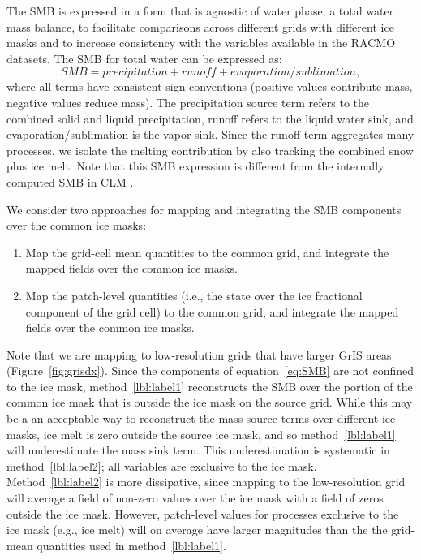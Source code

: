 \documentclass[draft]{agujournal2019}
\begin{document}
The SMB is expressed in a form that is agnostic of water phase, a total water mass balance, to facilitate comparisons across different grids with different ice masks and to increase consistency with the variables available in the RACMO datasets. The SMB for total water can be expressed as:
\begin{equation}
SMB = precipitation + runoff + evaporation/sublimation, \label{eq:SMB}
\end{equation}
where all terms have consistent sign conventions (positive values contribute mass, negative values reduce mass). The precipitation source term refers to the combined solid and liquid precipitation, runoff refers to the liquid water sink, and evaporation/sublimation is the vapor sink. Since the runoff term aggregates many processes, we isolate the melting contribution by also tracking the combined snow plus ice melt. Note that this SMB expression is different from the internally computed SMB in CLM \cite{KETAL2020JAMES}.

We consider two approaches for mapping and integrating the SMB components over the common ice masks:
\begin{enumerate}
\item Map the grid-cell mean quantities to the common grid, and integrate the mapped fields over the common ice masks. \label{lbl:label1}
\item Map the patch-level quantities (i.e., the state over the ice fractional component of the grid cell) to the common grid, and integrate the mapped fields over the common ice masks. \label{lbl:label2}
\end{enumerate}

Note that we are mapping to low-resolution grids that have larger GrIS areas (Figure~\ref{fig:grisdx}). Since the components of equation~\ref{eq:SMB} are not confined to the ice mask, method~\ref{lbl:label1} reconstructs the SMB over the portion of the common ice mask that is outside the ice mask on the source grid. While this may be a an acceptable way to reconstruct the mass source terms over different ice masks, ice melt is zero outside the source ice mask, and so method~\ref{lbl:label1} will underestimate the mass sink term. This underestimation is systematic in method~\ref{lbl:label2}; all variables are exclusive to the ice mask. Method~\ref{lbl:label2} is more dissipative, since mapping to the low-resolution grid will average a field of non-zero values over the ice mask with a field of zeros outside the ice mask. However, patch-level values for processes exclusive to the ice mask (e.g., ice melt) will on average have larger magnitudes than the the grid-mean quantities used in method~\ref{lbl:label1}. %
\end{document}
